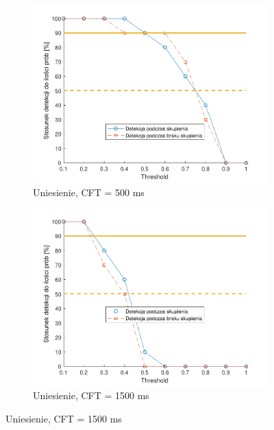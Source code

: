 \documentclass[skorowidz,skroty]{dyplomWEZUT}
\begin{document}
\begin{figure}
    \begin{subfigure}{0.49\textwidth}
    \includegraphics[width=\linewidth]{graphic/up500}
    \caption{Uniesienie, CFT = 500 ms\label{fig:up500}}
    \end{subfigure}\hspace*{\fill}
    \begin{subfigure}{0.49\textwidth}
    \includegraphics[width=\linewidth]{graphic/up1500}
    \caption{Uniesienie, CFT = 1500 ms\label{fig:up1500}}
    \end{subfigure}
    

\end{figure}
\end{document}
